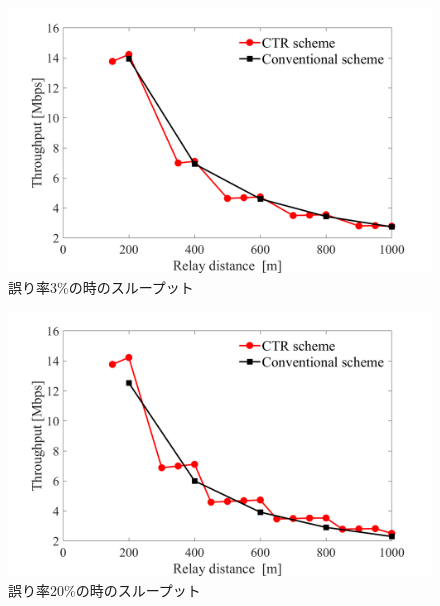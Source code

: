 \documentclass[a4paper,10pt]{ltjsarticle}
\begin{document}
\begin{figure}[H]
  \centering
  \includegraphics[width=\linewidth]{throughput_probabilistic_retry_0.03.png} %
  \caption{誤り率3\%の時のスループット}
  \label{fig:Throughput_0.03} %
\end{figure}
\begin{figure}[H]
  \centering
  \includegraphics[width=\linewidth]{throughput_probabilistic_retry_0.2.png} %
  \caption{誤り率20\%の時のスループット}
  \label{fig:Throughput_0.2} %
\end{figure}

\end{document}
